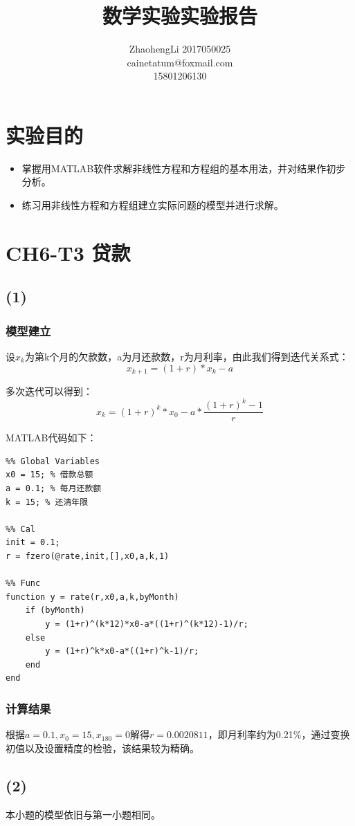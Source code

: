 \documentclass{article}
\title{数学实验实验报告}
\author{ZhaohengLi 2017050025\\cainetatum@foxmail.com\\15801206130}
\begin{document}
\maketitle
\section{实验目的}
\begin{itemize}
	\item{掌握用MATLAB软件求解非线性方程和方程组的基本用法，并对结果作初步分析。}
	\item{练习用非线性方程和方程组建立实际问题的模型并进行求解。}
\end{itemize}

\newpage
\section{CH6-T3 贷款}

\subsection{(1)}
\subsubsection{模型建立}
设$x_k$为第k个月的欠款数，a为月还款数，r为月利率，由此我们得到迭代关系式：
$$x_{k+1}=(1+r)*x_k-a$$

多次迭代可以得到：
$$x_k=(1+r)^k*x_0-a*\frac{(1+r)^k-1}{r}$$

MATLAB代码如下：

\begin{lstlisting}
%% Global Variables
x0 = 15; % 借款总额
a = 0.1; % 每月还款额
k = 15; % 还清年限

%% Cal
init = 0.1;
r = fzero(@rate,init,[],x0,a,k,1)

%% Func
function y = rate(r,x0,a,k,byMonth)
    if (byMonth)
        y = (1+r)^(k*12)*x0-a*((1+r)^(k*12)-1)/r;
    else
        y = (1+r)^k*x0-a*((1+r)^k-1)/r;
    end
end

\end{lstlisting}

\subsubsection{计算结果}
根据$a=0.1,x_0=15,x_{180}=0$解得$r=0.0020811$，即月利率约为0.21\%，通过变换初值以及设置精度的检验，该结果较为精确。

\subsection{(2)}
本小题的模型依旧与第一小题相同。
\end{document}

